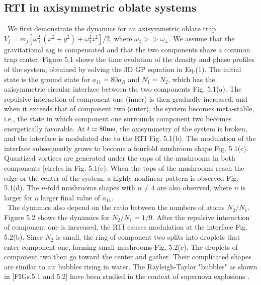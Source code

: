 \documentclass[12pt,a4paper]{report} %
\begin{document}
\subsection{RTI in axisymmetric oblate systems}
\ We first demonstrate the dynamics for an axisymmetric
oblate trap $\displaystyle V_j = m_j [\omega_\perp^2 (x^2+y^2)+\omega_z^2 z^2]/2$, where $\omega_z >> \omega_\perp$.
We assume that the gravitational sag is compensated and
that the two components share a common trap center. Figure 5.1
shows the time evolution of the density and phase profiles of
the system, obtained by solving the 3D GP equation in Eq.(1).
The initial state is the ground state for $a_{11} = 80 a_B$ and
$N_1 = N_2$, which has the axisymmetric circular interface between
the two components Fig. 5.1(a). The repulsive interaction
of component one (inner) is then gradually increased, and
when it exceeds that of component two (outer), the system
becomes meta-stable, i.e., the state in which component one
surrounds component two becomes energetically favorable.
At $t \simeq 80 {\rm ms}$, the axisymmetry of the system is broken, and
the interface is modulated due to the RTI Fig. 5.1(b). The
modulation of the interface subsequently grows to become a
fourfold mushroom shape Fig. 5.1(c). Quantized vortices are
generated under the caps of the mushrooms in both components
[circles in Fig. 5.1(e). When the tops of the mushrooms
reach the edge or the center of the system, a highly nonlinear
pattern is observed Fig. 5.1(d). The $n$-fold mushrooms shapes
with $n \neq 4$ are also observed, where $n$ is larger for a larger final
value of $a_{11}$.
\\
\ The dynamics also depend on the ratio between the
numbers of atoms $N_2 / N_1$. Figure 5.2 shows the dynamics for 
$N_2/N_1 = 1/9$. After the repulsive interaction of component
one is increased, the RTI causes modulation at the interface
Fig. 5.2(b). Since $N_2$ is small, the ring of component two
splits into droplets that enter component one, forming small
mushrooms Fig. 5.2(c). The droplets of component two then
go toward the center and gather. Their complicated shapes
are similar to air bubbles rising in water. The Rayleigh-Taylor
"bubbles" as shown in [FIGs.5.1 and 5.2] have been studied in the
context of supernova explosions \cite{67}.
\end{document}
